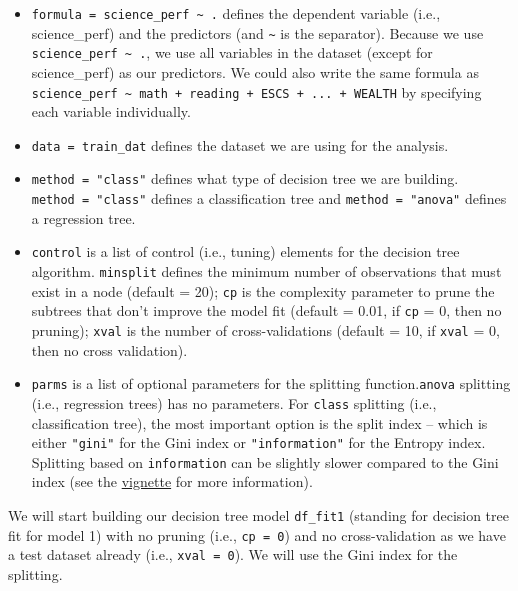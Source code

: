 \documentclass[
]{book}
\providecommand{\tightlist}{%
  \setlength{\itemsep}{0pt}\setlength{\parskip}{0pt}}
\begin{document}
\begin{itemize}
\tightlist
\item
  \texttt{formula\ =\ science\_perf\ \textasciitilde{}\ .} defines the dependent variable (i.e., science\_perf) and the predictors (and \texttt{\textasciitilde{}} is the separator). Because we use \texttt{science\_perf\ \textasciitilde{}\ .}, we use all variables in the dataset (except for science\_perf) as our predictors. We could also write the same formula as \texttt{science\_perf\ \textasciitilde{}\ math\ +\ reading\ +\ ESCS\ +\ ...\ +\ WEALTH} by specifying each variable individually.
\item
  \texttt{data\ =\ train\_dat} defines the dataset we are using for the analysis.
\item
  \texttt{method\ =\ "class"} defines what type of decision tree we are building. \texttt{method\ =\ "class"} defines a classification tree and \texttt{method\ =\ "anova"} defines a regression tree.
\item
  \texttt{control} is a list of control (i.e., tuning) elements for the decision tree algorithm. \texttt{minsplit} defines the minimum number of observations that must exist in a node (default = 20); \texttt{cp} is the complexity parameter to prune the subtrees that don't improve the model fit (default = 0.01, if \texttt{cp} = 0, then no pruning); \texttt{xval} is the number of cross-validations (default = 10, if \texttt{xval} = 0, then no cross validation).
\item
  \texttt{parms} is a list of optional parameters for the splitting function.\texttt{anova} splitting (i.e., regression trees) has no parameters. For \texttt{class} splitting (i.e., classification tree), the most important option is the split index -- which is either \texttt{"gini"} for the Gini index or \texttt{"information"} for the Entropy index. Splitting based on \texttt{information} can be slightly slower compared to the Gini index (see the \href{https://cran.r-project.org/web/packages/rpart/vignettes/longintro.pdf}{vignette} for more information).
\end{itemize}

We will start building our decision tree model \texttt{df\_fit1} (standing for decision tree fit for model 1) with no pruning (i.e., \texttt{cp\ =\ 0}) and no cross-validation as we have a test dataset already (i.e., \texttt{xval\ =\ 0}). We will use the Gini index for the splitting.
\end{document}
